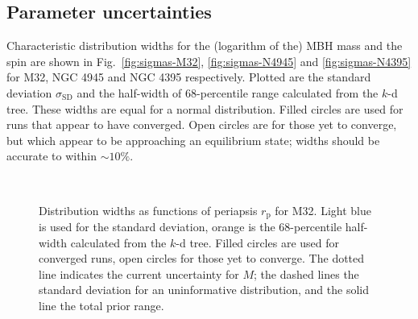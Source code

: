 \documentclass[useAMS,usedcolumn,usegraphicx,usenatbib]{mn2e}
\newcommand{\figref}[1]{Fig.~\ref{fig:#1}}
\newcommand{\sub}[1]{\ensuremath{_\mathrm{#1}}}
\begin{document}
\subsection{Parameter uncertainties}

Characteristic distribution widths for the (logarithm of the) MBH mass and the spin are shown in \figref{sigmas-M32}, \ref{fig:sigmas-N4945} and \ref{fig:sigmas-N4395} for M32, NGC 4945 and NGC 4395 respectively. Plotted are the standard deviation $\sigma\sub{SD}$ and the half-width of 68-percentile range calculated from the $k$-d tree. These widths are equal for a normal distribution. Filled circles are used for runs that appear to have converged. Open circles are for those yet to converge, but which appear to be approaching an equilibrium state; widths should be accurate to within $\sim 10\%$.

\begin{figure}
\begin{center}
 \quad
{} \\
\caption{Distribution widths as functions of periapsis $r\sub{p}$ for M32. Light blue is used for the standard deviation, orange is the $68$-percentile half-width calculated from the $k$-d tree. Filled circles are used for converged runs, open circles for those yet to converge. The dotted line indicates the current uncertainty for $M$; the dashed lines the standard deviation for an uninformative distribution, and the solid line the total prior range.}
\end{center}
\end{figure}
\end{document}
